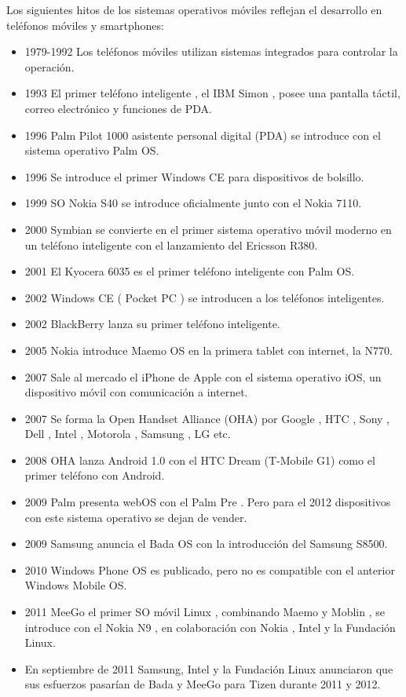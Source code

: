 Los siguientes hitos de los sistemas operativos móviles reflejan el desarrollo en teléfonos móviles y smartphones:
\begin{itemize}
	\item 1979-1992 Los teléfonos móviles utilizan sistemas integrados para controlar la operación.
	\item 1993 El primer teléfono inteligente , el IBM Simon , posee una pantalla táctil, correo electrónico y funciones de PDA.
	\item 1996 Palm Pilot 1000 asistente personal digital (PDA) se introduce con el sistema operativo Palm OS.
	\item 1996 Se introduce el primer Windows CE para dispositivos de bolsillo.
	\item 1999 SO Nokia S40 se introduce oficialmente junto con el Nokia 7110.
	\item 2000 Symbian se convierte en el primer sistema operativo móvil moderno en un teléfono inteligente con el lanzamiento del  Ericsson R380.
	\item 2001 El Kyocera 6035 es el primer teléfono inteligente con Palm OS.
	\item 2002 Windows CE ( Pocket PC ) se introducen a los teléfonos inteligentes.
	\item 2002 BlackBerry lanza su primer teléfono inteligente.
	\item 2005 Nokia introduce Maemo OS en la primera tablet con internet, la N770.
	\item 2007 Sale al mercado el iPhone de Apple con el sistema operativo iOS, un dispositivo móvil con comunicación a internet.
	\item 2007 Se forma la Open Handset Alliance (OHA) por Google , HTC , Sony , Dell , Intel , Motorola , Samsung , LG etc.
	\item 2008 OHA lanza Android 1.0 con el HTC Dream (T-Mobile G1) como el primer teléfono con Android.
	\item 2009 Palm presenta webOS con el Palm Pre . Pero para el 2012 dispositivos con este sistema operativo se dejan de vender.
	\item 2009 Samsung anuncia el Bada OS con la introducción del Samsung S8500.
	\item 2010 Windows Phone OS es publicado, pero no es compatible con el anterior Windows Mobile OS.
	\item 2011 MeeGo el primer SO móvil Linux , combinando Maemo y Moblin , se introduce con el Nokia N9 , en colaboración con Nokia , Intel y la Fundación Linux.
	\item En septiembre de 2011 Samsung, Intel y la Fundación Linux anunciaron que sus esfuerzos pasarían de Bada y MeeGo para Tizen durante 2011 y 2012.

\end{itemize}
